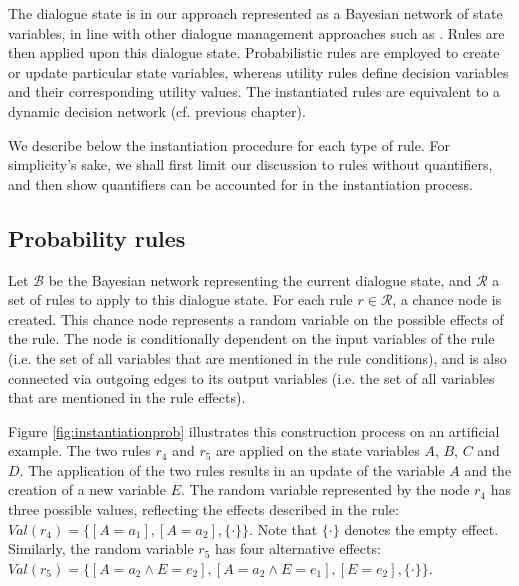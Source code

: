 The dialogue state is in our approach represented as a Bayesian network of state variables, in line with other dialogue management approaches such as \cite{Thomson:2010:BUD:1772996.1773040,bui2010}. Rules are then applied upon this dialogue state.  Probabilistic rules are employed to create or update particular state variables, whereas utility rules define decision variables and their corresponding utility values. The instantiated rules are equivalent to a dynamic decision network (cf. previous chapter). 

We describe below the instantiation procedure for each type of rule. For simplicity's sake, we shall first limit our discussion to rules without quantifiers, and then show quantifiers can be accounted for in the instantiation process. 

\subsection{Probability rules}
\label{sec:probruleinstantiation}

Let $\mathcal{B}$ be the Bayesian network representing the current dialogue state, and $\mathcal{R}$ a set of rules to apply to this dialogue state.  For each rule $r \in \mathcal{R}$, a chance node is created.  This chance node represents a random variable on the possible effects of the rule.  The node is conditionally dependent on the input variables of the rule (i.e. the set of all variables that are mentioned in the rule conditions), and is also connected via outgoing edges to its output variables (i.e. the set of all variables that are mentioned in the rule effects). 

Figure \ref{fig:instantiationprob} illustrates this construction process on an artificial example.  The two rules $r_4$ and $r_5$ are applied on the state variables $A$, $B$, $C$ and $D$.  The application of the two rules results in an update of the variable $A$ and the creation of a new variable $E$. The random variable represented by the node $r_4$ has three possible values, reflecting the effects described in the rule: $Val(r_4) = \{ [A\!=\!a_1], [A\!=\!a_2], \{\cdot\}\}$.  Note that $\{\cdot\}$ denotes the empty effect.  Similarly, the random variable $r_5$ has four alternative effects: $Val(r_5) = \{[A\!=\!a_2 \land E\!=\!e_2], [A\!=\!a_2 \land E\!=\!e_1], [E=e_2], \{\cdot\}\}$. 

